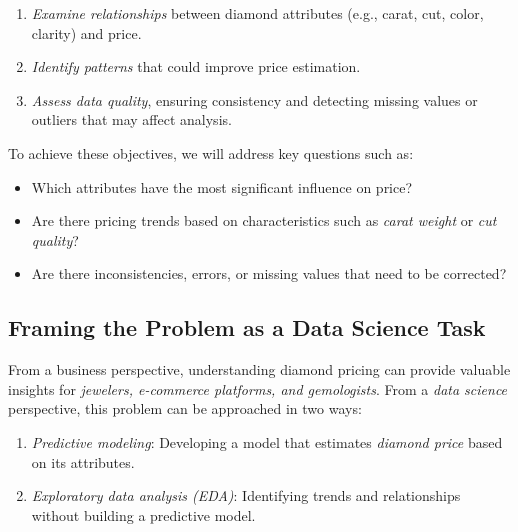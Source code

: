 \documentclass[
]{book}
\providecommand{\tightlist}{%
  \setlength{\itemsep}{0pt}\setlength{\parskip}{0pt}}
\theoremstyle{definition}
\theoremstyle{definition}
\theoremstyle{definition}
\theoremstyle{definition}
\theoremstyle{remark}
\begin{document}
\begin{enumerate}
\def\labelenumi{\arabic{enumi}.}
\tightlist
\item
  \emph{Examine relationships} between diamond attributes (e.g., carat, cut, color, clarity) and price.\\
\item
  \emph{Identify patterns} that could improve price estimation.\\
\item
  \emph{Assess data quality}, ensuring consistency and detecting missing values or outliers that may affect analysis.
\end{enumerate}

To achieve these objectives, we will address key questions such as:

\begin{itemize}
\tightlist
\item
  Which attributes have the most significant influence on price?\\
\item
  Are there pricing trends based on characteristics such as \emph{carat weight} or \emph{cut quality}?\\
\item
  Are there inconsistencies, errors, or missing values that need to be corrected?
\end{itemize}

\subsection*{Framing the Problem as a Data Science Task}\label{framing-the-problem-as-a-data-science-task}

From a business perspective, understanding diamond pricing can provide valuable insights for \emph{jewelers, e-commerce platforms, and gemologists}. From a \emph{data science} perspective, this problem can be approached in two ways:

\begin{enumerate}
\def\labelenumi{\arabic{enumi}.}
\tightlist
\item
  \emph{Predictive modeling}: Developing a model that estimates \emph{diamond price} based on its attributes.\\
\item
  \emph{Exploratory data analysis (EDA)}: Identifying trends and relationships without building a predictive model.
\end{enumerate}
\end{document}
